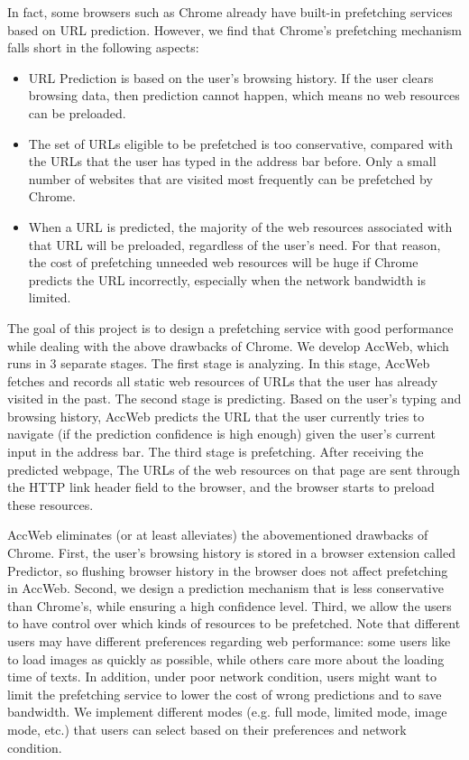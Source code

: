 In fact, some browsers such as Chrome already have built-in prefetching services based on URL prediction. However, we find that Chrome's prefetching mechanism falls short in the following aspects:
\begin{itemize}
	\item URL Prediction is based on the user's browsing history. If the user clears browsing data, then prediction cannot happen, which means no web resources can be preloaded.
	\item The set of URLs eligible to be prefetched is too conservative, compared with the URLs that the user has typed in the address bar before. Only a small number of websites that are visited most frequently can be prefetched by Chrome.
	\item When a URL is predicted, the majority of the web resources associated with that URL will be preloaded, regardless of the user's need. For that reason, the cost of prefetching unneeded web resources will be huge if Chrome predicts the URL incorrectly, especially when the network bandwidth is limited.
\end{itemize}

The goal of this project is to design a prefetching service with good performance while dealing with the above drawbacks of Chrome. We develop AccWeb, which runs in 3 separate stages. The first stage is analyzing. In this stage, AccWeb fetches and records all static web resources of URLs that the user has already visited in the past. The second stage is predicting. Based on the user's typing and browsing history, AccWeb predicts the URL that the user currently tries to navigate (if the prediction confidence is high enough) given the user's current input in the address bar. The third stage is prefetching. After receiving the predicted webpage, The URLs of the web resources on that page are sent through the HTTP link header field to the browser, and the browser starts to preload these resources.

AccWeb eliminates (or at least alleviates) the abovementioned drawbacks of Chrome. First, the user's browsing history is stored in a browser extension called Predictor, so flushing browser history in the browser does not affect prefetching in AccWeb. Second, we design a prediction mechanism that is less conservative than Chrome's, while ensuring a high confidence level. Third, we allow the users to have control over which kinds of resources to be prefetched. Note that different users may have different preferences regarding web performance: some users like to load images as quickly as possible, while others care more about the loading time of texts. In addition, under poor network condition, users might want to limit the prefetching service to lower the cost of wrong predictions and to save bandwidth. We implement different modes (e.g. full mode, limited mode, image mode, etc.) that users can select based on their preferences and network condition.


